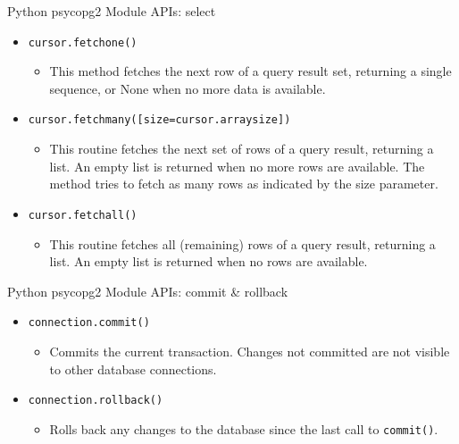 \documentclass[aspectratio=169, xcolor=dvipsnames]{beamer}
\begin{document}
\begin{frame}{Python psycopg2 Module APIs: select}
    \begin{itemize}
        \item \texttt{cursor.fetchone()}
        \begin{itemize}
            \item This method fetches the next row of a query result set, returning a single sequence, or None when no more data is available.
        \end{itemize}
        \item \texttt{cursor.fetchmany([size=cursor.arraysize])}
        \begin{itemize}
            \item This routine fetches the next set of rows of a query result, returning a list. An empty list is returned when no more rows are available. The method tries to fetch as many rows as indicated by the size parameter.
        \end{itemize}
        \item \texttt{cursor.fetchall()}
        \begin{itemize}
            \item This routine fetches all (remaining) rows of a query result, returning a list. An empty list is returned when no rows are available.
        \end{itemize}
    \end{itemize}
\end{frame}

\begin{frame}{Python psycopg2 Module APIs: commit \& rollback}
    \begin{itemize}[<+->]
        \item \texttt{connection.commit()}
        \begin{itemize}
            \item[$\triangleright$] Commits the current transaction. Changes not committed are not visible to other database connections.
        \end{itemize}
        \item \texttt{connection.rollback()}
        \begin{itemize}
            \item[$\triangleright$] Rolls back any changes to the database since the last call to \texttt{commit()}.
        \end{itemize}
    \end{itemize}
\end{frame}
\end{document}
